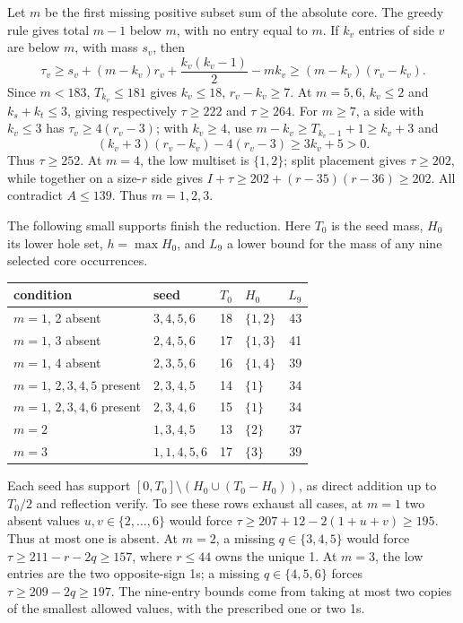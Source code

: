 \documentclass[11pt,letterpaper]{article}
\theoremstyle{definition}\newtheorem{definition}[theorem]{Definition}
\begin{document}
Let $m$ be the first missing positive subset sum of the absolute core.
The greedy rule gives total $m-1$ below $m$, with no entry equal to $m$.
If $k_v$ entries of side $v$ are below $m$, with mass $s_v$, then
\[
 \tau_v\ge s_v+(m-k_v)r_v+\frac{k_v(k_v-1)}2-mk_v
 \ge(m-k_v)(r_v-k_v).                         \tag{P4-low-rank}
\]
Since $m<183$, $T_{k_v}\le181$ gives $k_v\le18$, $r_v-k_v\ge7$.
At $m=5,6$, $k_v\le2$ and $k_s+k_t\le3$, giving respectively
$\tau\ge222$ and $\tau\ge264$. For $m\ge7$, a side with $k_v\le3$
has $\tau_v\ge4(r_v-3)$; with $k_v\ge4$, use
$m-k_v\ge T_{k_v-1}+1\ge k_v+3$ and
\[
 (k_v+3)(r_v-k_v)-4(r_v-3)
 \ge3k_v+5>0.
\]
Thus $\tau\ge252$. At $m=4$, the low multiset is $\{1,2\}$; split
placement gives $\tau\ge202$, while together on a size-$r$ side gives
$I+\tau\ge202+(r-35)(r-36)\ge202$.
All contradict $A\le139$. Thus $m=1,2,3$.

The following small supports finish the reduction. Here $T_0$ is the seed
mass, $H_0$ its lower hole set, $h=\max H_0$, and $L_9$ a lower bound for
the mass of any nine selected core occurrences.
\begin{center}\small
\begin{tabular}{l|l|r|l|r}
condition&seed&$T_0$&$H_0$&$L_9$\\\hline
$m=1$, 2 absent&$3,4,5,6$&18&$\{1,2\}$&43\\
$m=1$, 3 absent&$2,4,5,6$&17&$\{1,3\}$&41\\
$m=1$, 4 absent&$2,3,5,6$&16&$\{1,4\}$&39\\
$m=1$, $2,3,4,5$ present&$2,3,4,5$&14&$\{1\}$&34\\
$m=1$, $2,3,4,6$ present&$2,3,4,6$&15&$\{1\}$&34\\
$m=2$&$1,3,4,5$&13&$\{2\}$&37\\
$m=3$&$1,1,4,5,6$&17&$\{3\}$&39
\end{tabular}
\end{center}
Each seed has support $[0,T_0]\setminus(H_0\cup(T_0-H_0))$, as direct
addition up to $T_0/2$ and reflection verify. To see these rows exhaust
all cases, at $m=1$ two absent values $u,v\in\{2,\ldots,6\}$ would force
$\tau\ge207+12-2(1+u+v)\ge195$. Thus at most one is absent.
At $m=2$, a missing $q\in\{3,4,5\}$ would force
$\tau\ge211-r-2q\ge157$, where $r\le44$ owns the unique 1.
At $m=3$, the low entries are the two opposite-sign 1s; a missing
$q\in\{4,5,6\}$ forces $\tau\ge209-2q\ge197$.
The nine-entry bounds come from taking at most two copies of the smallest
allowed values, with the prescribed one or two 1s.
\end{document}
